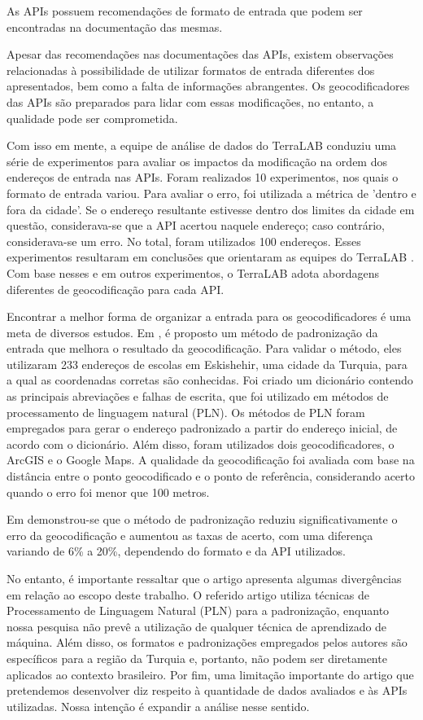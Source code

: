 As APIs possuem recomendações de formato de entrada que podem ser encontradas na documentação das mesmas. 

Apesar das recomendações nas documentações das APIs, existem observações relacionadas à possibilidade de utilizar formatos de entrada diferentes dos apresentados, bem como a falta de informações abrangentes. Os geocodificadores das APIs são preparados para lidar com essas modificações, no entanto, a qualidade pode ser comprometida.

Com isso em mente, a equipe de análise de dados do TerraLAB \cite{terralab} conduziu uma série de experimentos para avaliar os impactos da modificação na ordem dos endereços de entrada nas APIs. Foram realizados 10 experimentos, nos quais o formato de entrada variou. Para avaliar o erro, foi utilizada a métrica de 'dentro e fora da cidade'. Se o endereço resultante estivesse dentro dos limites da cidade em questão, considerava-se que a API acertou naquele endereço; caso contrário, considerava-se um erro. No total, foram utilizados 100 endereços. Esses experimentos resultaram em conclusões que orientaram as equipes do TerraLAB \cite{terralab}. Com base nesses e em outros experimentos, o TerraLAB adota abordagens diferentes de geocodificação para cada API. 

Encontrar a melhor forma de organizar a entrada para os geocodificadores é uma meta de diversos estudos. Em \cite{KUCUKMATCI2018}, é proposto um método de padronização da entrada que melhora o resultado da geocodificação. Para validar o método, eles utilizaram 233 endereços de escolas em Eskishehir, uma cidade da Turquia, para a qual as coordenadas corretas são conhecidas. Foi criado um dicionário contendo as principais abreviações e falhas de escrita, que foi utilizado em métodos de processamento de linguagem natural (PLN). Os métodos de PLN foram empregados para gerar o endereço padronizado a partir do endereço inicial, de acordo com o dicionário. Além disso, foram utilizados dois geocodificadores, o ArcGIS e o Google Maps. A qualidade da geocodificação foi avaliada com base na distância entre o ponto geocodificado e o ponto de referência, considerando acerto quando o erro foi menor que 100 metros.

Em \cite{KUCUKMATCI2018} demonstrou-se que o método de padronização reduziu significativamente o erro da geocodificação e aumentou as taxas de acerto, com uma diferença variando de 6\% a 20\%, dependendo do formato e da API utilizados.

No entanto, é importante ressaltar que o artigo apresenta algumas divergências em relação ao escopo deste trabalho. O referido artigo utiliza técnicas de Processamento de Linguagem Natural (PLN) para a padronização, enquanto nossa pesquisa não prevê a utilização de qualquer técnica de aprendizado de máquina. Além disso, os formatos e padronizações empregados pelos autores são específicos para a região da Turquia e, portanto, não podem ser diretamente aplicados ao contexto brasileiro. Por fim, uma limitação importante do artigo que pretendemos desenvolver diz respeito à quantidade de dados avaliados e às APIs utilizadas. Nossa intenção é expandir a análise nesse sentido.

